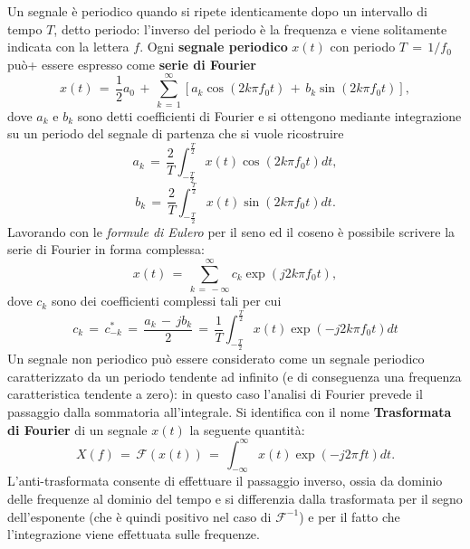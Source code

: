 Un segnale è periodico quando si ripete identicamente dopo un intervallo di tempo $T$, detto periodo: l'inverso del periodo
è la frequenza e viene solitamente indicata con la lettera $f$. Ogni \textbf{segnale periodico} $x(t)$ con periodo $T\,=\,1/f_0$ può+
essere espresso come \textbf{serie di Fourier}
\begin{equation}
    x\left(t\right)\,=\,\frac{1}{2}a_0\,+\,\sum_{k\,=\,1}^{\infty}\left[a_k\cos{\left(2k\pi f_0t\right)}\,+\,b_k\sin{\left(2k\pi f_0t\right)}\right],
    \label{equation: SerieFourier}
\end{equation}
dove $a_k$ e $b_k$ sono detti coefficienti di Fourier e si ottengono mediante integrazione su un periodo del segnale di partenza
che si vuole ricostruire
\begin{equation}
    a_k\,=\,\frac{2}{T}\int_{-\frac{T}{2}}^{\frac{T}{2}} x\left(t\right)\cos{\left(2k\pi f_0t\right)}dt,
    \label{equation: a_coeffFourier}
\end{equation}
\begin{equation}
    b_k\,=\,\frac{2}{T}\int_{-\frac{T}{2}}^{\frac{T}{2}} x\left(t\right)\sin{\left(2k\pi f_0t\right)}dt.
    \label{equation: b_coeffFourier}
\end{equation}
Lavorando con le \textit{formule di Eulero} per il seno ed il coseno è possibile scrivere la serie di Fourier in forma complessa:
\begin{equation}
    x\left(t\right)\,=\,\sum_{k\,=\,-\infty}^{\infty}c_k \exp{\left(j2k\pi f_0t\right)},
    \label{equation: Compl_SerieFourier}
\end{equation}
dove $c_k$ sono dei coefficienti complessi tali per cui
\begin{equation}
    c_k\,=\,c_{-k}^*\,=\,\frac{a_k\,-\,jb_k}{2}\,=\,\frac{1}{T}\int_{-\frac{T}{2}}^{\frac{T}{2}} x(t)\exp{\left(-j2k\pi f_0t\right)} dt
    \label{equation: complex_coeff}
\end{equation}
Un segnale non periodico può essere considerato come un segnale periodico caratterizzato da un periodo tendente ad infinito
(e di conseguenza una frequenza caratteristica tendente a zero): in questo caso l'analisi di Fourier prevede il passaggio
dalla sommatoria all'integrale. Si identifica con il nome \textbf{Trasformata di Fourier} di un segnale $x\left(t\right)$ la
seguente quantità:
\begin{equation}
    X\left(f\right)\,=\,\mathcal{F}\left(x\left(t\right)\right)\,=\,\int_{-\infty}^{\infty}x\left(t\right)\exp\left(-j2\pi ft\right) dt.
    \label{equation: FourierTransform}
\end{equation}
L'anti-trasformata consente di effettuare il passaggio inverso, ossia da dominio delle frequenze al dominio del tempo e si
differenzia dalla trasformata per il segno dell'esponente (che è quindi positivo nel caso di $\mathcal{F^{-1}}$) e per il
fatto che l'integrazione viene effettuata sulle frequenze.

